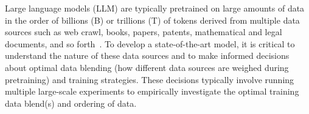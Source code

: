 \documentclass[11pt]{article}
\newcommand{\mostofa}[1]{{\color{blue}\bf [MP: #1]}\xspace}
\newcommand{\todo}[1]{{\color{red}\bf [TODO: #1]}\xspace}
\newcommand{\citereq}[1]{{\color{blue}\bf [CITE]}\xspace}
\begin{document}


Large language models (LLM) are typically pretrained on large amounts of data in the order of billions (B) or trillions (T) of tokens derived from multiple data sources such as web crawl, books, papers, patents, mathematical and legal documents, and so forth~\cite{brown2020languagemodelsfewshotlearners,parmar2024nemotron415btechnicalreport,gemmateam2024gemmaopenmodelsbased,dubey2024llama,nvidia2024nemotron4340btechnicalreport}.
To develop a state-of-the-art model, it is critical to understand the nature of these data sources and to make informed decisions about optimal data blending (how different data sources are weighed during pretraining) 
and training strategies. 
These decisions typically involve running multiple large-scale experiments to empirically investigate the optimal training data blend(s) and ordering of data.


\end{document}
